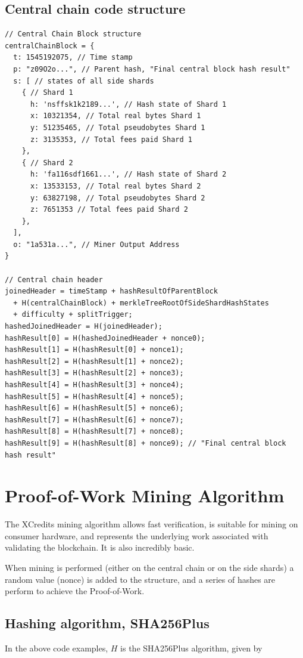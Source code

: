 \documentclass[a4paper,12pt]{article}
\begin{document}
\subsection{Central chain code structure}
\begin{lstlisting}
// Central Chain Block structure
centralChainBlock = {
  t: 1545192075, // Time stamp
  p: "z09O2o...", // Parent hash, "Final central block hash result"
  s: [ // states of all side shards
    { // Shard 1
      h: 'nsffsk1k2189...', // Hash state of Shard 1
      x: 10321354, // Total real bytes Shard 1
      y: 51235465, // Total pseudobytes Shard 1
      z: 3135353, // Total fees paid Shard 1
    }, 
    { // Shard 2
      h: 'fa116sdf1661...', // Hash state of Shard 2
      x: 13533153, // Total real bytes Shard 2
      y: 63827198, // Total pseudobytes Shard 2
      z: 7651353 // Total fees paid Shard 2
    }, 
  ],
  o: "1a531a...", // Miner Output Address
}

// Central chain header
joinedHeader = timeStamp + hashResultOfParentBlock 
  + H(centralChainBlock) + merkleTreeRootOfSideShardHashStates 
  + difficulty + splitTrigger;
hashedJoinedHeader = H(joinedHeader);
hashResult[0] = H(hashedJoinedHeader + nonce0);
hashResult[1] = H(hashResult[0] + nonce1);
hashResult[2] = H(hashResult[1] + nonce2);
hashResult[3] = H(hashResult[2] + nonce3);
hashResult[4] = H(hashResult[3] + nonce4);
hashResult[5] = H(hashResult[4] + nonce5);
hashResult[6] = H(hashResult[5] + nonce6);
hashResult[7] = H(hashResult[6] + nonce7);
hashResult[8] = H(hashResult[7] + nonce8);
hashResult[9] = H(hashResult[8] + nonce9); // "Final central block hash result"
\end{lstlisting}

\section{Proof-of-Work Mining Algorithm}

The XCredits mining algorithm allows fast verification, is suitable for mining on consumer hardware, and represents the underlying work associated with validating the blockchain. It is also incredibly basic. 

When mining is performed (either on the central chain or on the side shards) a random value (nonce) is added to the structure, and a series of hashes are perform to achieve the Proof-of-Work.

\subsection{Hashing algorithm, SHA256Plus}\label{SHA256Plus}
In the above code examples, $H$ is the SHA256Plus algorithm, given by
\end{document}
